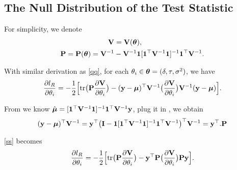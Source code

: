 \documentclass[article]{jss}
\begin{document}
\begin{appendix}
\subsection{The Null Distribution of the Test Statistic}

For simplicity, we denote
\begin{align*}
{\bf V}&={\bf V}(\boldsymbol{\theta}),\\
{\bf P}={\bf P}(\boldsymbol{\theta})={\bf V}^{-1}&-{\bf V}^{-1}\mathbf{1}[\mathbf{1}^\top {\bf V}^{-1}\mathbf{1}]^{-1}\mathbf{1}^\top {\bf V}^{-1}.
\end{align*}

With similar derivation as \eqref{qq}, for each $\theta_i \in \boldsymbol{\theta}=(\delta, \tau, \sigma^2)$, we have
\begin{align}
\frac{\partial l_R}{\partial \theta_i}=-\frac{1}{2}\Big[\mbox{tr}\big({\bf P} \frac{\partial {\bf V}}{\partial \theta_i}\big)-({\bf y}-\boldsymbol{\mu})^\top {\bf V}^{-1}\big(\frac{\partial {\bf V}}{\partial \theta_i}\big){\bf V}^{-1}({\bf y}-\boldsymbol{\mu})\Big]. \label{rr}
\end{align}

From \citep{liu_semiparametric_2007} we know $\hat{\boldsymbol{\mu}}=[\mathbf{1}^\top {\bf V}^{-1}\mathbf{1}]^{-1}\mathbf{1}^\top {\bf V}^{-1}{\bf y}$, plug it in \citep{lin_inference_1999}, we obtain 
\begin{align*}
({\bf y}-\boldsymbol{\mu})^\top {\bf V}^{-1}={\bf y}^\top  \big({\bf I}-\mathbf{1}[\mathbf{1}^\top {\bf V}^{-1}\mathbf{1}]^{-1}\mathbf{1}^\top {\bf V}^{-1}\big)^\top {\bf V}^{-1}={\bf y}^\top.  {\bf P}
\end{align*}

\eqref{ss} becomes 
\begin{align*}
\frac{\partial l_R}{\partial \theta_i}=-\frac{1}{2}\Big[\mbox{tr}\big({\bf P} \frac{\partial {\bf V}}{\partial \theta_i}\big)-{\bf y}^\top  {\bf P}\big(\frac{\partial {\bf V}}{\partial \theta_i}\big){\bf P} {\bf y} \Big].
\end{align*}


\end{appendix}
\end{document}
